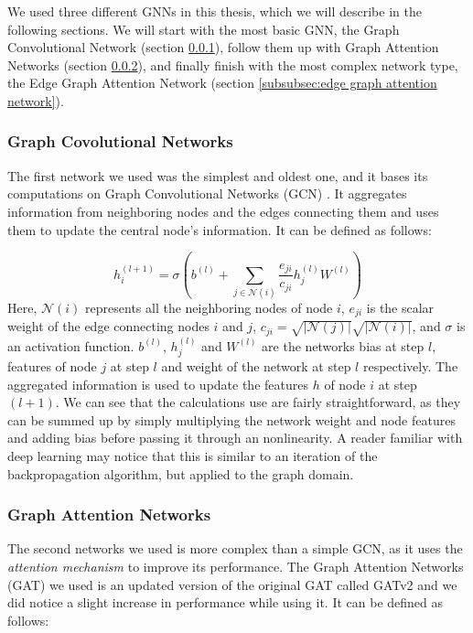 \documentclass[times, utf8, diplomski, english]{fer_eng}
\begin{document}
We used three different GNNs in this thesis, which we will describe in the following sections. We will start with the most basic GNN, the Graph Convolutional Network (section \ref{subsubsec:graph convolutional netwroks}), follow them up with Graph Attention Networks (section \ref{subsubsec:graph attention networks}), and finally finish with the most complex network type, the Edge Graph Attention Network (section \ref{subsubsec:edge graph attention network}).

\subsubsection{Graph Covolutional Networks}
\label{subsubsec:graph convolutional netwroks}

The first network we used was the simplest and oldest one, and it bases its computations on Graph Convolutional Networks (GCN) \cite{GCN}. It aggregates information from neighboring nodes and the edges connecting them and uses them to update the central node's information. It can be defined as follows:

\[ h_i^{(l+1)} = \sigma (b^{(l)} + \sum_{j \in \mathcal{N}(i)} \frac{e_{ji}}{c_{ji}} h_j^{(l)} W^{(l)} ) \]
Here, $\mathcal{N}(i)$ represents all the neighboring nodes of node $i$, $e_{ji}$ is the scalar weight of the edge connecting nodes $i$ and $j$, $c_{ji} = \sqrt{|\mathcal{N}(j)|} \sqrt{|\mathcal{N}(i)|}$, and $\sigma$ is an activation function. $b^{(l)}$, $h_j^{(l)}$ and $W^{(l)}$ are the networks bias at step $l$, features of node $j$ at step $l$ and weight of the network at step $l$ respectively. The aggregated information is used to update the features $h$ of node $i$ at step $(l+1)$. We can see that the calculations use are fairly straightforward, as they can be summed up by simply multiplying the network weight and node features and adding bias before passing it through an nonlinearity. A reader familiar with deep learning may notice that this is similar to an iteration of the backpropagation algorithm, but applied to the graph domain.

\subsubsection{Graph Attention Networks}
\label{subsubsec:graph attention networks}

The second networks we used is more complex than a simple GCN, as it uses the \textit{attention mechanism} \cite{attention} to improve its performance. The Graph Attention Networks (GAT) \cite{GATv2} we used is an updated version of the original GAT \cite{GAT} called GATv2 and we did notice a slight increase in performance while using it. It can be defined as follows:
\end{document}
